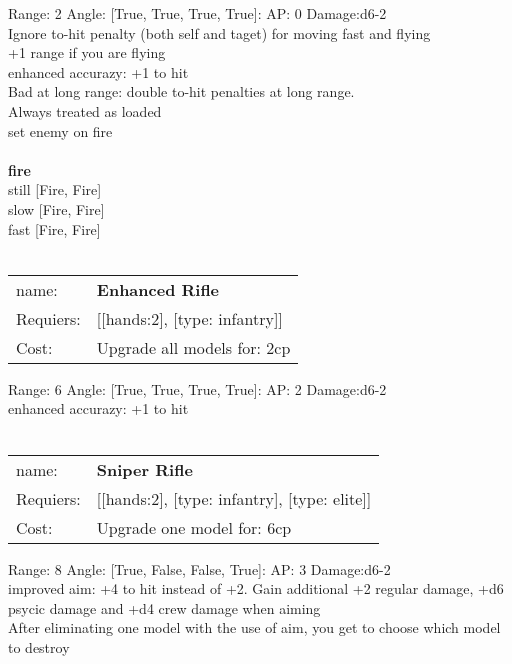 Range: 2  Angle: [True, True, True, True]: AP: 0 Damage:d6-2 \\
Ignore to-hit penalty (both self and taget) for moving fast and flying\\ 
+1 range if you are flying\\ 
enhanced accurazy: +1 to hit\\ 
Bad at long range: double to-hit penalties at long range.\\ 
Always treated as loaded\\ 
set enemy on fire\\ 







\ \\ {\bf fire } \\
still [Fire, Fire] \\
slow [Fire, Fire] \\
fast [Fire, Fire] \\

\ \\
\begin{tabular}{ll}
name: & {\bf Enhanced Rifle } \\
Requiers: & [[hands:2], [type: infantry]] \\
Cost: & Upgrade all models for: 2cp \\
\end{tabular}



Range: 6  Angle: [True, True, True, True]: AP: 2 Damage:d6-2 \\
enhanced accurazy: +1 to hit\\ 








\ \\
\begin{tabular}{ll}
name: & {\bf Sniper Rifle } \\
Requiers: & [[hands:2], [type: infantry], [type: elite]] \\
Cost: & Upgrade one model for: 6cp \\
\end{tabular}



Range: 8  Angle: [True, False, False, True]: AP: 3 Damage:d6-2 \\
improved aim: +4 to hit instead of +2. Gain additional +2 regular damage, +d6 psycic damage and +d4 crew damage when aiming\\ 
After eliminating one model with the use of aim, you get to choose which model to destroy\\ 








